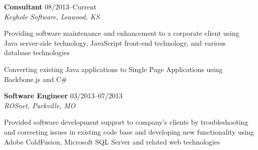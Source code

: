 \begin{itemize1}
	\item \textbf{Consultant} \textopenbullet{} 08/2013--Current \\
		\textit{Keyhole Software, Leawood, KS} \vspace{-1.5mm}
		\begin{itemize1}
			\item Providing software maintenance and enhancement to a corporate client using Java server-side technology, JavaScript front-end technology, and various database technologies
			\item Converting existing Java applications to Single Page Applications using Backbone.js and C\#
		\end{itemize1}
\end{itemize1}

\begin{itemize1}
	\item \textbf{Software Engineer} \textopenbullet{} 03/2013--07/2013 \\
		\textit{ROSnet, Parkville, MO} \vspace{-1.5mm}
		\begin{itemize1}
			\item Provided software development support to company's clients by troubleshooting and correcting issues in existing code base and developing new functionality using Adobe ColdFusion, Microsoft SQL Server and related web technologies
		\end{itemize1}
\end{itemize1}

